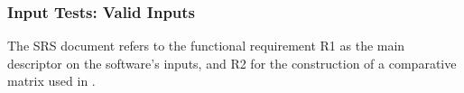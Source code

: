 \documentclass[12pt, titlepage]{article}
\begin{document}


\subsubsection{Input Tests: Valid Inputs}

The SRS document \citet{SRS} refers to the functional requirement R1 as the main 
descriptor on the software's inputs, and R2 for the construction of a comparative matrix 
used in \citet{NEEDLEMAN1970443}.
		
\end{document}
